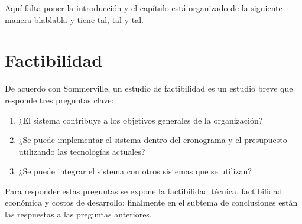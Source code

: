 





Aquí falta poner la introducción y el capítulo está organizado de la siguiente manera blablabla y tiene tal, tal y tal.


\section{Factibilidad}\label{ref:sec-factibilidad}

De acuerdo con Sommerville\cite{sommerville_software_2011}, un estudio de factibilidad es un estudio breve que responde tres preguntas clave:

\begin{enumerate}
    \item ¿El sistema contribuye a los objetivos generales de la organización? 
    \item ¿Se puede implementar el sistema dentro del cronograma y el presupuesto utilizando las tecnologías actuales? 
    \item ¿Se puede integrar el sistema con otros sistemas que se utilizan? 
\end{enumerate}


Para responder estas preguntas se expone la factibilidad técnica, factibilidad económica y costos de desarrollo; finalmente en el subtema de conclusiones están las respuestas a las preguntas anteriores.

